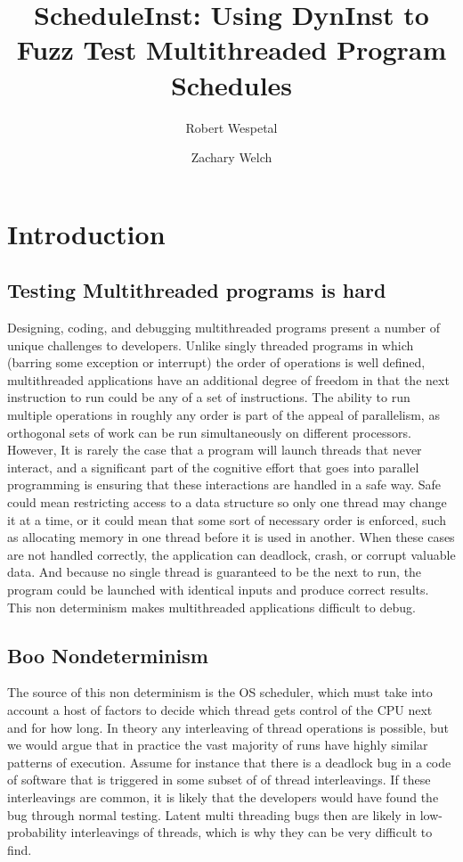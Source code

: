 \documentclass[10pt,]{article} %
\title{ScheduleInst: Using DynInst to Fuzz Test Multithreaded Program Schedules}
\author{Robert Wespetal\\
\and
Zachary Welch}
\begin{document}
\setlength{\baselineskip}{18pt}

\maketitle

\begin{abstract}
\setlength{\baselineskip}{18pt}

 \end{abstract}


\section{Introduction}
\subsection{Testing Multithreaded programs is hard}

Designing, coding, and debugging multithreaded programs present a number of unique challenges to developers.
 Unlike singly threaded programs in which (barring some exception or interrupt) the order of operations is well defined, multithreaded applications have an additional degree of freedom in that the next instruction to run could be any of a set of instructions.
The ability to run multiple operations in roughly any order is part of the appeal of parallelism, as orthogonal sets of work can be run simultaneously on different processors. 
 However, It is rarely the case that a program will launch threads that never interact, and a significant part of the cognitive effort that goes into parallel programming is ensuring that these interactions are handled in a safe way.
 Safe could mean restricting access to a data structure so only one thread may change it at a time, or it could mean that some sort of necessary order is enforced, such as allocating memory in one thread before it is used in another. 
 When these cases are not handled correctly, the application can deadlock, crash, or corrupt valuable data.
  And because no single thread is guaranteed to be the next to run, the program could be launched with identical  inputs and produce correct results. 
 This non determinism makes multithreaded applications difficult to debug.

\subsection{Boo Nondeterminism}

The source of this non determinism is the OS scheduler, which must take into account a host of factors to decide which thread gets control of the CPU next and for how long.
  In theory any interleaving of thread operations is possible, but we would argue that in practice the vast majority of runs have highly similar patterns of execution. 
 Assume for instance that there is a deadlock bug in a code of software that is triggered in some subset of of thread interleavings. 
If these interleavings are common, it is likely that the developers would have found the bug through normal testing.  
Latent multi threading bugs then are likely in low-probability interleavings of threads, which is why they can be very difficult to find.   
\end{document}
